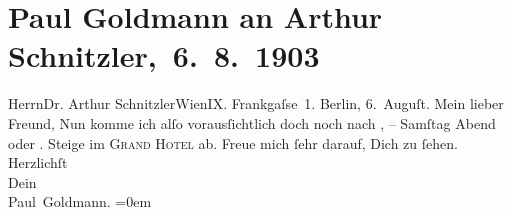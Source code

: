 

         \renewcommand{\erwaehnteOrte}{Orte: Berlin, Frankgasse, Grand Hotel Wien, Wien}
         \renewcommand{\erwaehnteWerke}{}
               \section[ Paul Goldmann an Arthur Schnitzler, 6. 8. 1903]{ Paul Goldmann an Arthur Schnitzler, 6. 8. 1903}\nopagebreak{}\rehead{ }\begin{ledgroupsized}[t]{13cm}\normalsize\beginnumbering \toendnotes[C]{\smallbreak\pagebreak[2]} 
\toendnotes[C]{\smallbreak}\pstart{}{\pb}Herrn\pend{}\pstart{}Dr. Arthur Schnitzler\pend{}\pstart{}Wien\pend{}\pstart{}IX. Frankgaſse 1.\pend{}{\bigskip}\pstart
           {\pb}Berlin, 6. Auguſt.\pend
           \pstart{}Mein lieber Freund,\pend\pstart
           Nun komme ich alſo vorausſichtlich doch noch nach \label{K_L03381-1v}\label{K_L03381-1h}, – Samſtag{ }Abend oder \label{K_L03381-3v}\label{K_L03381-3h}.
               Steige im \textsc{Grand Hotel} ab. Freue mich ſehr darauf, Dich zu ſehen.\pend
           \pstart
           Herzlichſt {\\[\baselineskip]}Dein {\\[\baselineskip]}\spacefill\mbox{Paul Goldmann.}\pend
           \leftskip=0em{}
         
         \endnumbering{}\end{ledgroupsized}  \newcommand{\dateiname}{L03381}\newcommand{\titel}{Paul Goldmann an Arthur Schnitzler, 6. 8. 1903}\newcommand{\editorInnen}{Martin Anton Müller und Laura Untner}
      